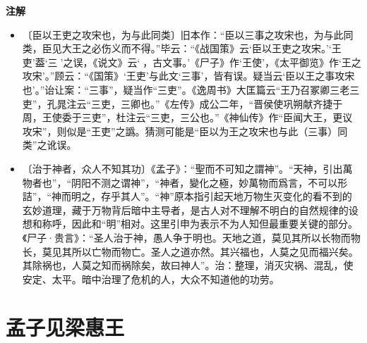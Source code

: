 \documentclass[12pt,UTF-8,openany,a4]{ctexbook}
\begin{document}
\newpage

\begin{Large}
    \noindent\textbf{注解}
\end{Large}


\vspace{-1em}

\begin{itemize}
    \setlength\itemsep{-0.2em}
    \item〔臣以王吏之攻宋也，为与此同类〕{\yiwen 旧本作：“臣以三事之攻宋也，为与此同类，臣见大王之必伤义而不得。”毕云：“《战国策》云‘臣以王吏之攻宋。’‘王吏’葢‘三𠭏’之误，《说文》云‘𠭏，古文事。’《尸子》作‘王使’，《太平御览》作‘王之攻宋’。”顾云：“《国策》‘王吏’与此文‘三事’，皆有误。疑当云‘臣以王之事攻宋也’。”诒让案：“三事”，疑当作“三吏”。《逸周书》大匡篇云“王乃召冢卿三老三吏”，孔晁注云“三吏，三卿也。”《左传》成公二年，“晋侯使巩朔献齐捷于周，王使委于三吏”，杜注云“三吏，三公也。”《神仙传》作“臣闻大王，更议攻宋”，则似是“王吏”之譌。猜测可能是“臣以为王之攻宋也与此（三事）同类”之讹误。}
    \item〔治于神者，众人不知其功〕{\yiwen 《孟子》：“聖而不可知之謂神”。“天神，引出萬物者也”，“阴阳不测之谓神”，“神者，變化之極，妙萬物而爲言，不可以形詰”，“神而明之，存乎其人”。“神”原本指引起天地万物生灭变化的看不到的玄妙道理，藏于万物背后暗中主导者，是古人对不理解不明白的自然规律的设想和称呼，因此和“明”相对。这里引申为表示不为人知但最重要关键的部分。《尸子·贵言》：“圣人治于神，愚人争于明也。天地之道，莫见其所以长物而物长，莫见其所以亡物而物亡。圣人之道亦然。其兴福也，人莫之见而福兴矣。其除祸也，人莫之知而祸除矣，故曰神人”。治：整理，消灭灾祸、混乱，使安定、太平。暗中治理了危机的人，大众不知道他的功劳。}
\end{itemize}

\chapter{孟子见梁惠王}
\end{document}
